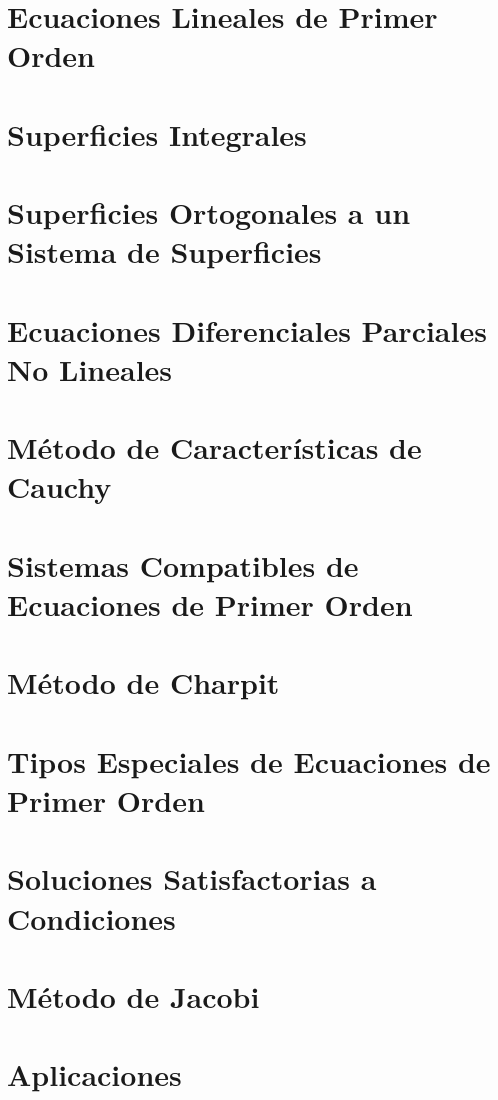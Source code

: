 \section{Ecuaciones Lineales de Primer Orden}

\section{Superficies Integrales}

\section{Superficies Ortogonales a un Sistema de Superficies}

\section{Ecuaciones Diferenciales Parciales No Lineales}

\section{Método de Características de Cauchy}

\section{Sistemas Compatibles de Ecuaciones de Primer Orden}

\section{Método de Charpit}

\section{Tipos Especiales de Ecuaciones de Primer Orden}

\section{Soluciones Satisfactorias a Condiciones}

\section{Método de Jacobi}

\section{Aplicaciones}



